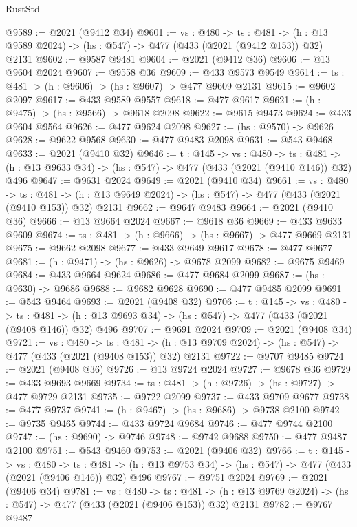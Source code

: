 \begin{lexlean}{RustStd}
\begin{coremodule}
{\begin{coremodule}
{{{{{{{{{{{{{{{{@9589 := @2021 (@9412 @34)
@9601 := {vs : @480} ->
  {ts : @481} -> (h : @13 @9589 @2024) -> (hs : @547) -> @477 (@433 (@2021 (@9412 @153)) @32) @2131
@9602 := @9587 @9481
@9604 := @2021 (@9412 @36)
@9606 := @13 @9604 @2024
@9607 := @9558 @36
@9609 := @433 @9573 @9549
@9614 := {ts : @481} -> (h : @9606) -> (hs : @9607) -> @477 @9609 @2131
@9615 := @9602 @2097
@9617 := @433 @9589 @9557
@9618 := @477 @9617
@9621 := (h : @9475) -> (hs : @9566) -> @9618 @2098
@9622 := @9615 @9473
@9624 := @433 @9604 @9564
@9626 := @477 @9624 @2098
@9627 := (hs : @9570) -> @9626
@9628 := @9622 @9568
@9630 := @477 @9483 @2098
@9631 := @543 @9468
@9633 := @2021 (@9410 @32)
@9646 := {t : @145} ->
  {vs : @480} ->
  {ts : @481} -> (h : @13 @9633 @34) -> (hs : @547) -> @477 (@433 (@2021 (@9410 @146)) @32) @496
@9647 := @9631 @2024
@9649 := @2021 (@9410 @34)
@9661 := {vs : @480} ->
  {ts : @481} -> (h : @13 @9649 @2024) -> (hs : @547) -> @477 (@433 (@2021 (@9410 @153)) @32) @2131
@9662 := @9647 @9483
@9664 := @2021 (@9410 @36)
@9666 := @13 @9664 @2024
@9667 := @9618 @36
@9669 := @433 @9633 @9609
@9674 := {ts : @481} -> (h : @9666) -> (hs : @9667) -> @477 @9669 @2131
@9675 := @9662 @2098
@9677 := @433 @9649 @9617
@9678 := @477 @9677
@9681 := (h : @9471) -> (hs : @9626) -> @9678 @2099
@9682 := @9675 @9469
@9684 := @433 @9664 @9624
@9686 := @477 @9684 @2099
@9687 := (hs : @9630) -> @9686
@9688 := @9682 @9628
@9690 := @477 @9485 @2099
@9691 := @543 @9464
@9693 := @2021 (@9408 @32)
@9706 := {t : @145} ->
  {vs : @480} ->
  {ts : @481} -> (h : @13 @9693 @34) -> (hs : @547) -> @477 (@433 (@2021 (@9408 @146)) @32) @496
@9707 := @9691 @2024
@9709 := @2021 (@9408 @34)
@9721 := {vs : @480} ->
  {ts : @481} -> (h : @13 @9709 @2024) -> (hs : @547) -> @477 (@433 (@2021 (@9408 @153)) @32) @2131
@9722 := @9707 @9485
@9724 := @2021 (@9408 @36)
@9726 := @13 @9724 @2024
@9727 := @9678 @36
@9729 := @433 @9693 @9669
@9734 := {ts : @481} -> (h : @9726) -> (hs : @9727) -> @477 @9729 @2131
@9735 := @9722 @2099
@9737 := @433 @9709 @9677
@9738 := @477 @9737
@9741 := (h : @9467) -> (hs : @9686) -> @9738 @2100
@9742 := @9735 @9465
@9744 := @433 @9724 @9684
@9746 := @477 @9744 @2100
@9747 := (hs : @9690) -> @9746
@9748 := @9742 @9688
@9750 := @477 @9487 @2100
@9751 := @543 @9460
@9753 := @2021 (@9406 @32)
@9766 := {t : @145} ->
  {vs : @480} ->
  {ts : @481} -> (h : @13 @9753 @34) -> (hs : @547) -> @477 (@433 (@2021 (@9406 @146)) @32) @496
@9767 := @9751 @2024
@9769 := @2021 (@9406 @34)
@9781 := {vs : @480} ->
  {ts : @481} -> (h : @13 @9769 @2024) -> (hs : @547) -> @477 (@433 (@2021 (@9406 @153)) @32) @2131
@9782 := @9767 @9487
}}}}}}}}}}}}}}}}
\end{coremodule}}
\end{coremodule}
\end{lexlean}
